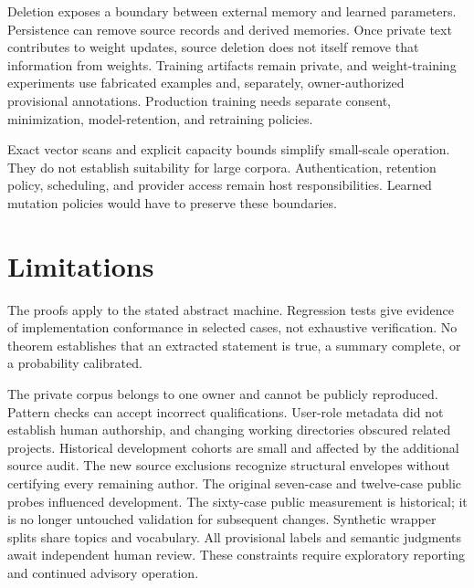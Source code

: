 \documentclass[11pt]{article}
\begin{document}
Deletion exposes a boundary between external memory and learned parameters. Persistence can remove source records and derived memories. Once private text contributes to weight updates, source deletion does not itself remove that information from weights. Training artifacts remain private, and weight-training experiments use fabricated examples and, separately, owner-authorized provisional annotations. Production training needs separate consent, minimization, model-retention, and retraining policies.

Exact vector scans and explicit capacity bounds simplify small-scale operation. They do not establish suitability for large corpora. Authentication, retention policy, scheduling, and provider access remain host responsibilities. Learned mutation policies would have to preserve these boundaries.



\section{Limitations}
The proofs apply to the stated abstract machine. Regression tests give evidence of implementation conformance in selected cases, not exhaustive verification. No theorem establishes that an extracted statement is true, a summary complete, or a probability calibrated.

The private corpus belongs to one owner and cannot be publicly reproduced. Pattern checks can accept incorrect qualifications. User-role metadata did not establish human authorship, and changing working directories obscured related projects. Historical development cohorts are small and affected by the additional source audit. The new source exclusions recognize structural envelopes without certifying every remaining author. The original seven-case and twelve-case public probes influenced development. The sixty-case public measurement is historical; it is no longer untouched validation for subsequent changes. Synthetic wrapper splits share topics and vocabulary. All provisional labels and semantic judgments await independent human review. These constraints require exploratory reporting and continued advisory operation.


\end{document}
